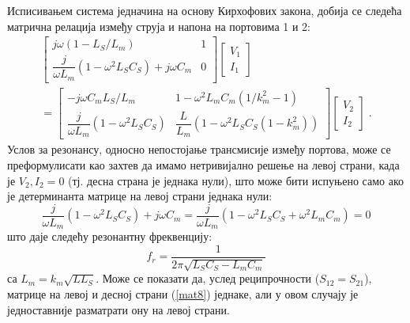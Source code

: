 Исписивањем система једначина на основу Кирхофових закона, добија се следећа матрична релација између струја и напона на портовима 1 и 2:
\begin{multline}\label{mat8}
\begin{bmatrix}
j\omega (1-L_S/L_m) & 1 \\
\dfrac{j}{\omega L_m}(1-\omega^2 L_S C_S) + j\omega C_m & 0
\end{bmatrix}
\begin{bmatrix} V_1 \\ I_1 \end{bmatrix}  \\  = 
\begin{bmatrix}
-j\omega C_m L_S/L_m & 1 - \omega^2 L_m C_m (1/k_m^2 -1) \\
\dfrac{j}{\omega L_m}(1-\omega^2 L_S C_S) & \dfrac{L}{L_m}(1-\omega^2 L_S C_S(1-k_m^2))
\end{bmatrix}
\begin{bmatrix} V_2 \\ I_2 \end{bmatrix}\;.
\end{multline}
Услов за резонансу, односно непостојање трансмисије између портова, може се преформулисати као захтев да имамо нетривијално решење на левој страни, када је $V_2,I_2=0$ (тј. десна страна је једнака нули), што може бити испуњено само ако је детерминанта матрице на левој страни једнака нули:
\begin{equation}
\frac{j}{\omega L_m}(1-\omega^2 L_S C_S) + j\omega C_m
= \frac{j}{\omega L_m}(1-\omega^2 L_S C_S+\omega^2 L_m C_m)=0
\end{equation}
што даје следећу резонантну фреквенцију:
\begin{equation}
f_r = \frac{1}{2\pi\sqrt{L_S C_S - L_mC_m}} 
\end{equation}
са $L_m=k_m\sqrt{LL_S}$. 
Може се показати да, услед реципрочности ($S_{12}=S_{21}$), матрице на левој и десној страни (\ref{mat8}) једнаке, али у овом случају је једноставније разматрати ону на левој страни.

